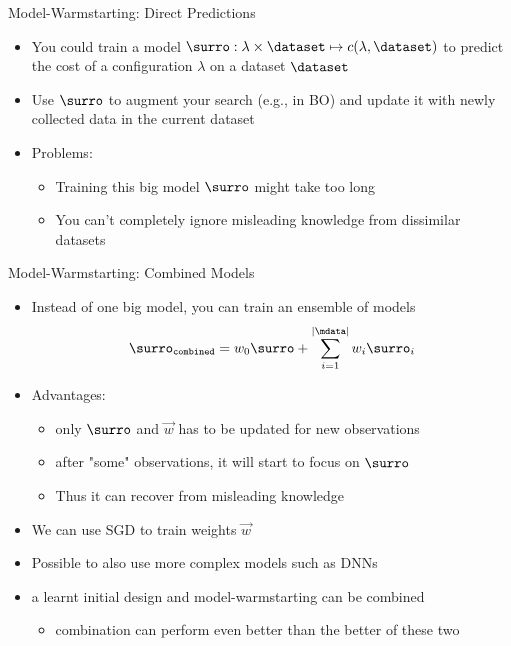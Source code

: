 \begin{frame}[c]{Model-Warmstarting: Direct Predictions}

\begin{itemize}
	\item You could train a model $\surro: \lambda \times \dataset \mapsto c(\lambda, \dataset)$ to predict the cost of a configuration $\lambda$ on a dataset $\dataset$ 
	\pause
	\item Use $\surro$ to augment your search (e.g., in BO) and update it with newly collected data in the current dataset
	\pause
	\item Problems:
	\begin{itemize}
		\item Training this big model $\surro$ might take too long
		\item You can't completely ignore misleading knowledge from dissimilar datasets
	\end{itemize}
\end{itemize}


\end{frame}
\begin{frame}[c]{Model-Warmstarting: Combined Models}

\begin{itemize}
	\item Instead of one big model, you can train an ensemble of models
	$$ \surro_{\texttt{combined}} = w_0 \surro + \sum_{i=1}^{|\mdata|} w_i \surro_i$$
	\pause
	\item Advantages:
	\begin{itemize}
		\item only $\surro$ and $\vec{w}$ has to be updated for new observations
		\item after "some" observations, it will start to focus on $\surro$ 
		\item Thus it can recover from misleading knowledge
	\end{itemize}
	\medskip
	\pause
	\item We can use SGD to train weights $\vec{w}$
	\pause
	\item Possible to also use more complex models such as DNNs
	\pause
	\medskip
	\item a learnt initial design and model-warmstarting can be combined
	\begin{itemize}
		\item combination can perform even better than the better of these two
	\end{itemize}
\end{itemize}


\end{frame}
